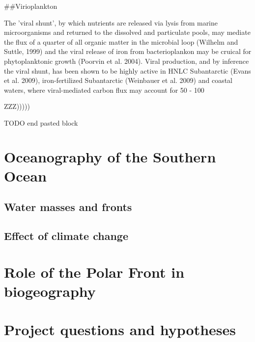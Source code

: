 ##Virioplankton

The 'viral shunt', by which nutrients are released via lysis from marine microorganisms and returned to the dissolved and particulate pools, may mediate the flux of a quarter of all organic matter in the microbial loop (Wilhelm and Suttle, 1999) and the viral release of iron from bacterioplankon may be cruical for phytoplanktonic growth (Poorvin et al. 2004). Viral production, and by inference the viral shunt, has been shown to be highly active in HNLC Subantarctic (Evans et al. 2009), iron-fertilized Subantarctic (Weinbauer et al. 2009) and coastal waters, where viral-mediated carbon flux may account for 50 - 100%


ZZZ)))))


TODO end pasted block


\section{Oceanography of the Southern Ocean}


\subsection{Water masses and fronts}
\subsection{Effect of climate change}
\section{Role of the Polar Front in biogeography}
\section{Project questions and hypotheses}
